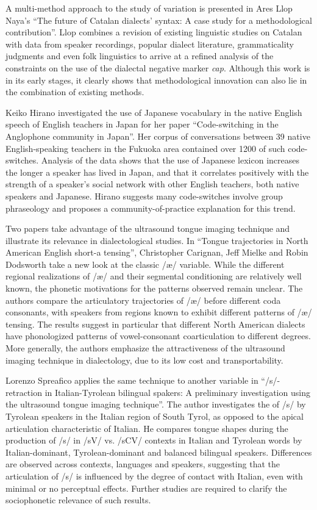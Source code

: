 \documentclass[output=paper]{LSP/langsci}
\begin{document}
A multi-method approach to the study of variation is presented in Ares Llop Naya’s “The future of Catalan dialects’ syntax: A case study for a methodological contribution”. Llop combines a revision of existing linguistic studies on Catalan with data from speaker recordings, popular dialect literature, grammaticality judgments and even folk linguistics to arrive at a refined analysis of the constraints on the use of the dialectal negative marker \textit{cap}. Although this work is in its early stages, it clearly shows that methodological innovation can also lie in the combination of existing methods.

Keiko Hirano investigated the use of Japanese vocabulary in the native English speech of English teachers in Japan for her paper “Code-switching in the Anglophone community in Japan”. Her corpus of conversations between 39 native English-speaking teachers in the Fukuoka area contained over 1200 of such code-switches. Analysis of the data shows that the use of Japanese lexicon increases the longer a speaker has lived in Japan, and that it correlates positively with the strength of a speaker’s social network with other English teachers, both native speakers and Japanese. Hirano suggests many code-switches involve group phraseology and proposes a community-of-practice explanation for this trend.

Two papers take advantage of the ultrasound tongue imaging technique and illustrate its relevance in dialectological studies. In “Tongue trajectories in North American English short-a tensing”, Christopher Carignan, Jeff Mielke and Robin Dodsworth take a new look at the classic /æ/ variable. While the different regional realizations of /æ/ and their segmental conditioning are relatively well known, the phonetic motivations for the patterns observed remain unclear. The authors compare the articulatory trajectories of /æ/ before different coda consonants, with speakers from regions known to exhibit different patterns of /æ/ tensing. The results suggest in particular that different North American dialects have phonologized patterns of vowel-consonant coarticulation to different degrees. More generally, the authors emphasize the attractiveness of the ultrasound imaging technique in dialectology, due to its low cost and transportability.

Lorenzo Spreafico applies the same technique to another variable in “/s/-retraction in Italian-Tyrolean bilingual spakers: A preliminary investigation using the ultrasound tongue imaging technique”. The author investigates the 
of /s/ by Tyrolean speakers in the Italian region of South Tyrol, as opposed to the apical articulation characteristic of Italian. He compares tongue shapes during the production of /s/ in /sV/ vs. /sCV/ contexts in Italian and Tyrolean words by Italian-dominant, Tyrolean-dominant and balanced bilingual speakers. Differences are observed across contexts, languages and speakers, suggesting that the articulation of /s/ is influenced by the degree of contact with Italian, even with minimal or no perceptual effects. Further studies are required to clarify the sociophonetic relevance of such results. 
\end{document}
